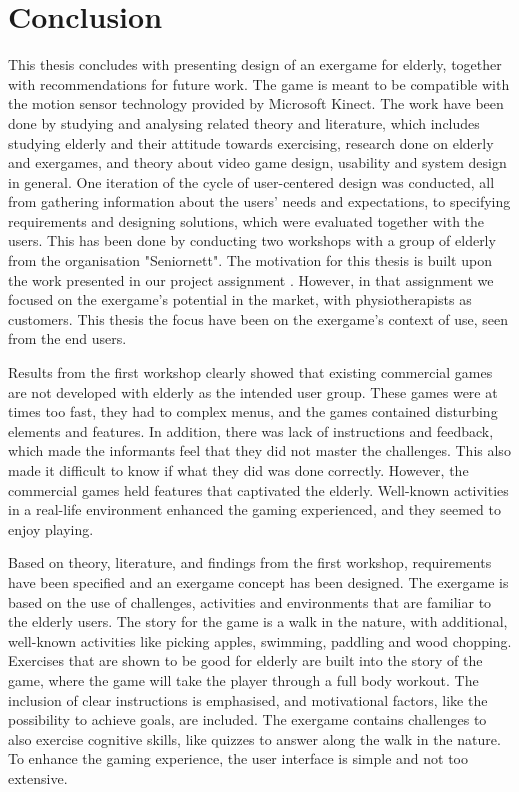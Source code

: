 \chapter{Conclusion}

This thesis concludes with presenting design of an exergame for elderly, together with recommendations for future work. The game is meant to be compatible with the motion sensor technology provided by Microsoft Kinect. The work have been done by studying and analysing related theory and literature, which includes studying elderly and their attitude towards exercising, research done on elderly and exergames, and theory about video game design, usability and system design in general. One iteration of the cycle of user-centered design was conducted, all from gathering information about the users' needs and expectations, to specifying requirements and designing solutions, which were evaluated together with the users. This has been done by conducting two workshops with a group of elderly from the organisation "Seniornett". The motivation for this thesis is built upon the work presented in our project assignment \cite{project}. However, in that assignment we focused on the exergame's potential in the market, with physiotherapists as customers. This thesis the focus have been on the exergame's context of use, seen from the end users. 

Results from the first workshop clearly showed that existing commercial games are not developed with elderly as the intended user group. These games were at times too fast, they had to complex menus, and the games contained disturbing elements and features. In addition, there was lack of instructions and feedback, which made the informants feel that they did not master the challenges. This also made it difficult to know if what they did was done correctly. However, the commercial games held features that captivated the elderly. Well-known activities in a real-life environment enhanced the gaming experienced, and they seemed to enjoy playing. 

Based on theory, literature, and findings from the first workshop, requirements have been specified and an exergame concept has been designed. The exergame is based on the use of challenges, activities and environments that are familiar to the elderly users. The story for the game is a walk in the nature, with additional, well-known activities like picking apples, swimming, paddling and wood chopping. Exercises that are shown to be good for elderly are built into the story of the game, where the game will take the player through a full body workout. The inclusion of clear instructions is emphasised, and motivational factors, like the possibility to achieve goals, are included. The exergame contains challenges to also exercise cognitive skills, like quizzes to answer along the walk in the nature. To enhance the gaming experience, the user interface is simple and not too extensive.

